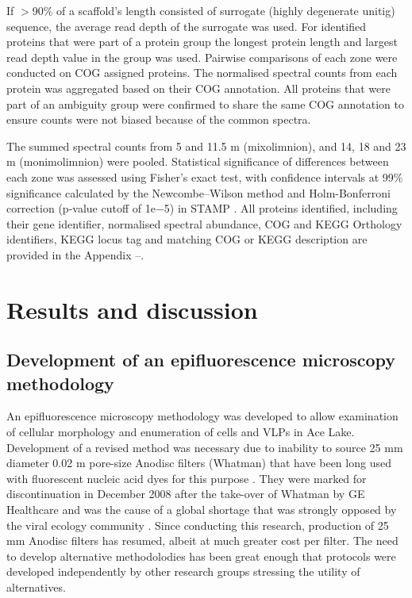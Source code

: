 If $>$90\% of a scaffold’s length consisted of surrogate (highly degenerate unitig) sequence, the average read depth of the surrogate was used. 
For identified proteins that were part of a protein group the longest protein length and largest read depth value in the group was used. 
Pairwise comparisons of each zone were conducted on \ac{COG} assigned proteins. 
The normalised spectral counts from each protein was aggregated based on their \ac{COG} annotation. 
All proteins that were part of an ambiguity group were confirmed to share the same \ac{COG} annotation to ensure counts were not biased because of the common spectra.

The summed spectral counts from 5 and 11.5 m (mixolimnion), and 14, 18 and 23 m (monimolimnion) were pooled. 
Statistical significance of differences between each zone was assessed using Fisher's exact test, with confidence intervals at 99\% significance calculated by the Newcombe–Wilson method and Holm-Bonferroni correction (p-value cutoff of 1e$-$5) in \ac{STAMP} \cite{Parks2010}. 
All proteins identified, including their gene identifier, normalised spectral abundance, \ac{COG} and \ac{KEGG} Orthology identifiers, \ac{KEGG} locus tag and matching \ac{COG} or \ac{KEGG} description are provided in the Appendix --.




\section{Results and discussion}

\subsection[Development of an epifluorescence microscopy methodology]{Development of an epifluorescence microscopy methodology}
An epifluorescence microscopy methodology was developed to allow examination of cellular morphology and enumeration of cells and \acp{VLP} in Ace Lake.
Development of a revised method was necessary due to inability to source 25 mm diameter 0.02 \textmu{}m pore-size Anodisc filters (Whatman) that have been long used with fluorescent nucleic acid dyes for this purpose \cite{Hennes1995, Noble1998, Patel2007}. 
They were marked for discontinuation in December 2008 after the take-over of Whatman by \textsc{GE} Healthcare and was the cause of a global shortage that was strongly opposed by the viral ecology community \cite{Torrice2009}.
Since conducting this research, production of 25 mm Anodisc filters has resumed, albeit at much greater cost per filter. 
The need to develop alternative methodolodies has been great enough that protocols were developed independently by other research groups \cite{Budinoff2011, Diemer2012} stressing the utility of alternatives.

